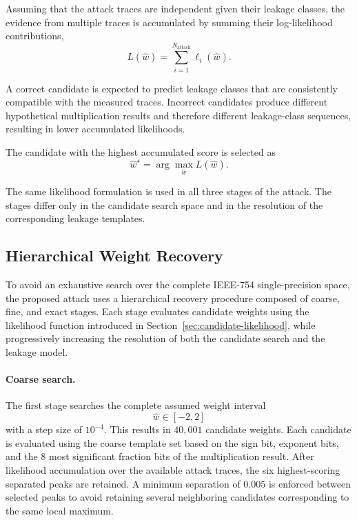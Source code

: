 \documentclass[conference]{IEEEtran}
\begin{document}
Assuming that the attack traces are independent given their leakage classes, the evidence from multiple traces is accumulated by summing their log-likelihood contributions,
\begin{equation*}
	L(\hat{w})
	=
	\sum_{i=1}^{N_{\mathrm{attack}}}
	\ell_i(\hat{w}).
\end{equation*}

A correct candidate is expected to predict leakage classes that are consistently compatible with the measured traces.
Incorrect candidates produce different hypothetical multiplication results and therefore different leakage-class sequences, resulting in lower accumulated likelihoods.

The candidate with the highest accumulated score is selected as
\begin{equation*}
	\hat{w}^{\star}
	=
	\arg\max_{\hat{w}} L(\hat{w}).
\end{equation*}

The same likelihood formulation is used in all three stages of the attack.
The stages differ only in the candidate search space and in the resolution of the corresponding leakage templates.

\subsection{Hierarchical Weight Recovery}
\label{sec:hierarchical-recovery}

To avoid an exhaustive search over the complete IEEE-754 single-precision space, the proposed attack uses a hierarchical recovery procedure composed of coarse, fine, and exact stages.
Each stage evaluates candidate weights using the likelihood function introduced in Section~\ref{sec:candidate-likelihood}, while progressively increasing the resolution of both the candidate search and the leakage model.

\paragraph{Coarse search.}
The first stage searches the complete assumed weight interval
\begin{equation*}
	\hat{w} \in [-2,2]
\end{equation*}
with a step size of $10^{-4}$.
This results in $40{,}001$ candidate weights.
Each candidate is evaluated using the coarse template set based on the sign bit, exponent bits, and the $8$ most significant fraction bits of the multiplication result.
After likelihood accumulation over the available attack traces, the six highest-scoring separated peaks are retained.
A minimum separation of $0.005$ is enforced between selected peaks to avoid retaining several neighboring candidates corresponding to the same local maximum.
\end{document}
